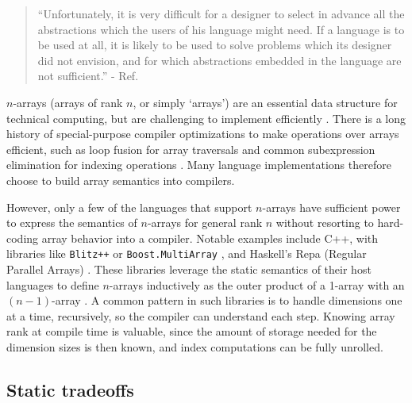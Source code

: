 \documentclass[preprint]{sigplanconf}
\newcommand{\code}[1]{\texttt{#1}}
\begin{document}
\begin{quotation}
``Unfortunately, it is very difficult for a designer to select in advance all
the abstractions which the users of his language might need. If a language is
to be used at all, it is likely to be used to solve problems which its
designer did not envision, and for which abstractions embedded in the language
are not sufficient.'' - Ref. \cite{Liskov:1974pb}
\end{quotation}

$n$-arrays (arrays of rank $n$, or simply `arrays') are an essential data
structure for technical computing, but are challenging to implement
efficiently \cite{Sattley:1960as,Sattley:1961as, Randell:1964a6}. There is a
long history of special-purpose compiler optimizations to make operations over
arrays efficient, such as loop fusion for array traversals and common
subexpression elimination for indexing operations \cite{Randell:1964a6,
Busam:1969oe}. Many language implementations therefore choose to build array
semantics into compilers.

However, only a few of the languages that support $n$-arrays have sufficient
power to express the semantics of $n$-arrays for general rank $n$ without
resorting to hard-coding array behavior into a compiler.
Notable examples include C++, with libraries like
\code{Blitz++} \cite{Veldhuizen:1998ab} or \code{Boost.MultiArray}
\cite{Garcia:2005ma}, and Haskell's Repa (Regular Parallel Arrays)
\cite{Keller:2010rs,Lippmeier:2011ep, Lippmeier:2012gp}. These libraries
leverage the static semantics of their host languages to
define $n$-arrays inductively as the outer product of a 1-array with an
$(n-1)$-array \cite{Bavestrelli:2000ct}.
A common pattern in such libraries is to handle dimensions one at a time,
recursively, so the compiler can understand each step.
Knowing array rank at compile time is valuable, since the amount of
storage needed for the dimension sizes is then known, and index
computations can be fully unrolled.


\subsection{Static tradeoffs}
\end{document}

